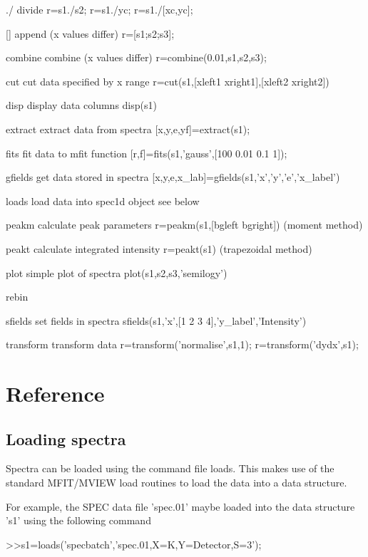 \documentclass[a4paper]{article}
\begin{document}
./		divide				r=s1./s2;
                                                r=s1./yc;
                                                r=s1./[xc,yc];

[]		append (x values differ)	r=[s1;s2;s3];

combine		combine (x values differ)	r=combine(0.01,s1,s2,s3);

cut             cut data specified by x range   r=cut(s1,[xleft1 xright1],[xleft2 xright2])

disp		display data columns		disp(s1)

extract		extract data from spectra	[x,y,e,yf]=extract(s1); 

fits            fit data to mfit function       [r,f]=fits(s1,'gauss',[100 0.01 0.1 1]);

gfields         get data stored in spectra      [x,y,e,x_lab]=gfields(s1,'x','y','e','x_label')

loads		load data into spec1d object	see below

peakm           calculate peak parameters       r=peakm(s1,[bgleft bgright])
                (moment method)

peakt           calculate integrated intensity  r=peakt(s1)
                (trapezoidal method)

plot		simple plot of spectra		plot(s1,s2,s3,'semilogy')

rebin

sfields         set fields in spectra           sfields(s1,'x',[1 2 3 4],'y_label','Intensity')

transform       transform data                  r=transform('normalise',s1,1);
                                                r=transform('dydx',s1);


\section{Reference}

\subsection{Loading spectra}

Spectra can be loaded using the command file loads.
This makes use of the standard MFIT/MVIEW load routines
to load the data into a data structure.

For example, the SPEC data file 'spec.01' maybe loaded into
the data structure 's1' using the following command

>>s1=loads('specbatch','spec.01,X=K,Y=Detector,S=3');
\end{document}

